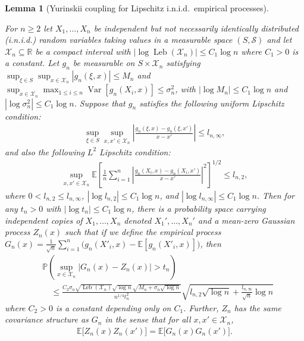 \documentclass[11pt,lof]{puthesis}
\renewcommand{\P}{\ensuremath{\mathbb{P}}}
\newcommand{\R}{\ensuremath{\mathbb{R}}}
\newcommand{\E}{\ensuremath{\mathbb{E}}}
\newcommand{\cX}{\ensuremath{\mathcal{X}}}
\newcommand{\cS}{\ensuremath{\mathcal{S}}}
\DeclareMathOperator{\Var}{Var}
\DeclareMathOperator{\Leb}{Leb}
\theoremstyle{break}
\newtheorem{lemma}{Lemma}[section]
\theoremstyle{proof}
\begin{document}
\begin{lemma}[Yurinskii coupling for Lipschitz i.n.i.d.\ empirical processes]
  \label{lem:kernel_app_yurinskii_corollary}

  For $n \geq 2$ let $X_1, \dots, X_n$
  be independent but not necessarily identically distributed
  (i.n.i.d.) random variables
  taking values in a measurable space $(S, \cS)$
  and let $\cX_n \subseteq \R$
  be a compact interval
  with $\left|\log \Leb(\cX_n)\right| \leq C_1 \log n$
  where $C_1 > 0$ is a constant.
  Let $g_n$ be measurable on $S \times \cX_n$ satisfying
  $\sup_{\xi \in S} \sup_{x \in \cX_n} |g_n(\xi, x)| \leq M_n$
  and
  $\sup_{x \in \cX_n} \max_{1 \leq i \leq n} \Var[g_n(X_i, x)]
  \leq \sigma_n^2$,
  with $\left|\log M_n\right| \leq C_1 \log n$
  and $\left|\log \sigma_n^2\right| \leq C_1 \log n$.
  Suppose that $g_n$ satisfies the following uniform
  Lipschitz condition:
  \begin{align*}
    \sup_{\xi \in S}
    \sup_{x,x' \in \cX_n}
    \left|
    \frac{g_n(\xi, x) - g_n(\xi, x')}
    {x-x'}
    \right|
    \leq
    l_{n,\infty},
  \end{align*}
  and also the following $L^2$
  Lipschitz condition:
  \begin{align*}
    \sup_{x,x' \in \cX_n}
    \E\left[
      \frac{1}{n}
      \sum_{i=1}^n
      \left|
      \frac{g_n(X_i, x) - g_n(X_i, x')}
      {x-x'}
      \right|^2
    \right]^{1/2}
    \leq
    l_{n,2},
  \end{align*}
  where $0 < l_{n,2} \leq l_{n,\infty}$,
  $\left|\log l_{n,2}\right| \leq C_1 \log n$, and
  $\left|\log l_{n,\infty}\right| \leq C_1 \log n$.
  Then for any $t_n > 0$ with
  $\left|\log t_n\right| \leq C_1 \log n$,
  there is a probability space carrying
  independent copies of $X_1, \ldots, X_n$ denoted $X_1', \ldots, X_n'$
  and a mean-zero Gaussian process $Z_n(x)$
  such that if we define the empirical process
  $G_n(x) = \frac{1}{\sqrt n} \sum_{i=1}^n
  \big( g_n(X'_i,x) - \E[g_n(X'_i,x)] \big)$,
  then
  \begin{align*}
    &\P\left(
      \sup_{x \in \cX_n}
      \big|
      G_n(x) - Z_n(x)
      \big|
      > t_n
    \right) \\
    &\quad\leq
    \frac{
      C_2
      \sigma_n
      \sqrt{\Leb(\cX_n)}
      \sqrt{\log n}
      \sqrt{M_n + \sigma_n\sqrt{\log n}}
    }{n^{1/4} t_n^2}
    \sqrt{
      l_{n,2}
      \sqrt{\log n}
      + \frac{l_{n,\infty}}{\sqrt n}
    \log n}
  \end{align*}
  where $C_2 > 0$ is a constant depending only on $C_1$.
  Further, $Z_n$
  has the same covariance structure as $G_n$
  in the sense that for all $x, x' \in \cX_n$,
  \begin{align*}
    \E\big[Z_n(x) Z_n(x')\big]
    = \E\big[G_n(x) G_n(x')\big].
  \end{align*}

\end{lemma}
\end{document}
